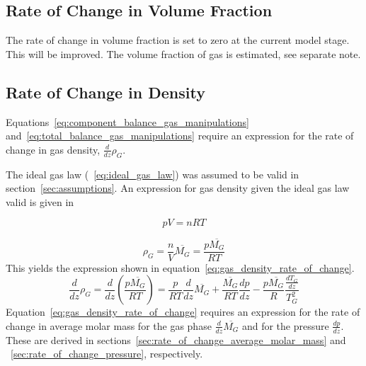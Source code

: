 \documentclass{article}
\begin{document}
\subsection{Rate of Change in Volume Fraction}
The rate of change in volume fraction is set to zero at the current model stage. This will be improved. The volume fraction of gas is estimated, see separate note.

\subsection{Rate of Change in Density}
Equations~\ref{eq:component_balance_gas_manipulations} and~\ref{eq:total_balance_gas_manipulations} require an expression for the rate of change in gas density, $\frac{d}{dz}\rho_G$.

The ideal gas law (~\ref{eq:ideal_gas_law}) was assumed to be valid in section~\ref{sec:assumptions}. An expression for gas density given the ideal gas law valid is given in 

\begin{equation}
	pV = nRT
	\label{eq:ideal_gas_law}
\end{equation}

\begin{equation}
	\rho_G=\frac{n}{V}\overline{M_G}=\frac{p\overline{M_G}}{RT}
	\label{eq:gas_density_by_ideal_gas_law}
\end{equation}
This yields the expression shown in equation~\ref{eq:gas_density_rate_of_change}.
\begin{equation}
	\frac{d}{dz}\rho_G = \frac{d}{dz}\left( \frac{p\overline{M_G}}{RT}\right) = \frac{p}{RT}\frac{d}{dz} \overline{M_G} + \frac{\overline{M_G} }{RT}\frac{dp}{dz} - \frac{p\overline{M_G}}{R}\frac{\frac{dT_G}{dz}}{T_G^2}
	\label{eq:gas_density_rate_of_change}
\end{equation}
Equation~\ref{eq:gas_density_rate_of_change} requires an expression for the rate of change in average molar mass for the gas phase $\frac{d}{dz}\overline{M_G}$ and for the pressure $\frac{dp}{dz}$. These are derived in sections~\ref{sec:rate_of_change_average_molar_mass} and ~\ref{sec:rate_of_change_pressure}, respectively.
\end{document}
